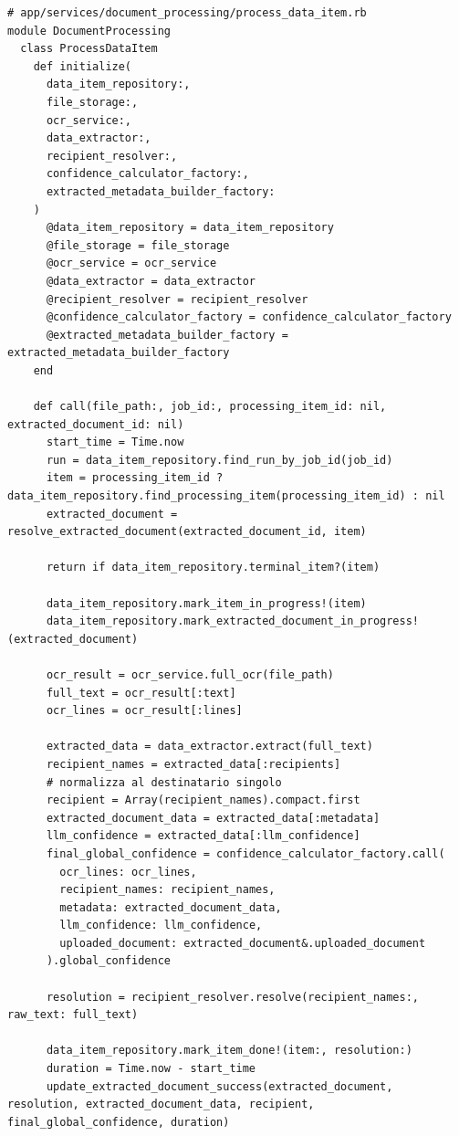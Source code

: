 \documentclass[a4paper,11pt]{article}
\newcommand{\code}[1]{\texttt{#1}}
\begin{document}
\begin{lstlisting}[caption={ProcessDataItem -- struttura del metodo \code{call}}]
# app/services/document_processing/process_data_item.rb
module DocumentProcessing
  class ProcessDataItem
    def initialize(
      data_item_repository:,
      file_storage:,
      ocr_service:,
      data_extractor:,
      recipient_resolver:,
      confidence_calculator_factory:,
      extracted_metadata_builder_factory:
    )
      @data_item_repository = data_item_repository
      @file_storage = file_storage
      @ocr_service = ocr_service
      @data_extractor = data_extractor
      @recipient_resolver = recipient_resolver
      @confidence_calculator_factory = confidence_calculator_factory
      @extracted_metadata_builder_factory = extracted_metadata_builder_factory
    end

    def call(file_path:, job_id:, processing_item_id: nil, extracted_document_id: nil)
      start_time = Time.now
      run = data_item_repository.find_run_by_job_id(job_id)
      item = processing_item_id ? data_item_repository.find_processing_item(processing_item_id) : nil
      extracted_document = resolve_extracted_document(extracted_document_id, item)

      return if data_item_repository.terminal_item?(item)

      data_item_repository.mark_item_in_progress!(item)
      data_item_repository.mark_extracted_document_in_progress!(extracted_document)

      ocr_result = ocr_service.full_ocr(file_path)
      full_text = ocr_result[:text]
      ocr_lines = ocr_result[:lines]

      extracted_data = data_extractor.extract(full_text)
      recipient_names = extracted_data[:recipients]
      # normalizza al destinatario singolo
      recipient = Array(recipient_names).compact.first
      extracted_document_data = extracted_data[:metadata]
      llm_confidence = extracted_data[:llm_confidence]
      final_global_confidence = confidence_calculator_factory.call(
        ocr_lines: ocr_lines,
        recipient_names: recipient_names,
        metadata: extracted_document_data,
        llm_confidence: llm_confidence,
        uploaded_document: extracted_document&.uploaded_document
      ).global_confidence

      resolution = recipient_resolver.resolve(recipient_names:, raw_text: full_text)

      data_item_repository.mark_item_done!(item:, resolution:)
      duration = Time.now - start_time
      update_extracted_document_success(extracted_document, resolution, extracted_document_data, recipient, final_global_confidence, duration)


\end{lstlisting}
\end{document}
